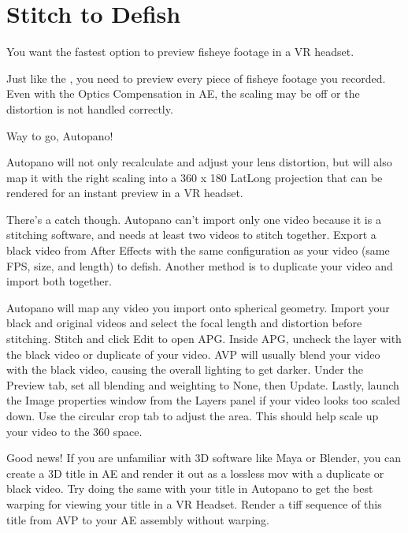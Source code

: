 \chapter{Stitch to Defish}
\pagecolor{white}
\label{chap:52}
\begin{fullwidth}

\problem

{\large You want the fastest option to preview fisheye footage in a VR headset. \par}

Just like the \textbf{}, you need to preview every piece of fisheye footage you recorded. Even with the Optics Compensation in AE, the scaling may be off or the distortion is not handled correctly.

\solution

{\large Way to go, Autopano! \par}

Autopano will not only recalculate and adjust your lens distortion, but will also map it with the right scaling into a 360 x 180 LatLong projection that can be rendered for an instant preview in a VR headset.

There’s a catch though. Autopano can’t import only one video because it is a stitching software, and needs at least two videos to stitch together. Export a black video from After Effects with the same configuration as your video (same FPS, size, and length) to defish. Another method is to duplicate your video and import both together.


Autopano will map any video you import onto spherical geometry. Import your black and original videos and select the focal length and distortion before stitching. Stitch and click Edit to open APG. Inside APG, uncheck the layer with the black video or duplicate of your video. AVP will usually blend your video with the black video, causing the overall lighting to get darker. Under the Preview tab, set all blending and weighting to None, then Update. Lastly, launch the Image properties window from the Layers panel if your video looks too scaled down. Use the circular crop tab to adjust the area. This should help scale up your video to the 360 space.




Good news! If you are unfamiliar with 3D software like Maya or Blender, you can create a 3D title in AE and render it out as a lossless mov with a duplicate or black video. Try doing the same with your title in Autopano to get the best warping for viewing your title in a VR Headset. Render a tiff sequence of this title from AVP to your AE assembly without warping.


\clearpage
\end{fullwidth}